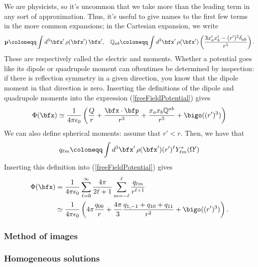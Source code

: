 \documentclass[11pt]{article}
\begin{document}
We are physicists, so it's uncommon that we take more than the leading
term in any sort of approximation. Thus, it's useful to give names to the
first few terms in the more common expansions; in the Cartesian expansion,
we write
\begin{align*}
    & \mathbf{p} \coloneqq \int d^3 \bfx' \, \rho(\bfx') \, \bfx',
    & \mathbb{Q}_{ab} \coloneqq \int d^3 \bfx' \, \rho(\bfx') \left( \frac{3x_a' x_b' - (r')^2 \delta_{ab}}{r^5} \right).
\end{align*}
These are respectively called the electric  and 
moments. Whether a potential goes like its dipole or quadrupole moment can oftentimes
be determined by inspection: if there is reflection symmetry in a given direction,
you know that the dipole moment in that direction is zero.  Inserting the definitions of the dipole and quadrupole moments
into the expression (\ref{freeFieldPotential}) gives
\begin{align*}
    \Phi(\bfx) \simeq \frac{1}{4\pi\epsilon_0} \left( \frac{Q}{r} + \frac{\bfx \cdot \bfp}{r^3} + \frac{x_a x_b \mathbb{Q}^{ab}}{r^5} + \bigo((r')^3) \right)
\end{align*}
We can also define spherical moments: assume that $r' < r$. Then, we have
that
\begin{align*}
    q_{\ell m} \coloneqq \int d^3 \bfx' \, \rho(\bfx') (r')^\ell Y_{\ell m}^*(\Omega')
\end{align*}
Inserting this definition into (\ref{freeFieldPotential}) gives
\begin{align*}
    \Phi(\bfx) & = \frac{1}{4\pi\epsilon_0} \sum_{\ell = 0}^\infty \frac{4\pi}{2\ell + 1} \sum_{m = -\ell}^\ell \frac{q_{\ell m}}{r^{\ell + 1}}\\
    & \simeq \frac{1}{4\pi\epsilon_0} \left( 4\pi \frac{q_{00}}{r} + \frac{4\pi}{3} \frac{q_{1, -1} + q_{10} + q_{11}}{r^2} + \bigo((r')^3) \right).
\end{align*}

\begin{eexample}
\end{eexample}

\subsubsection{Method of images}

\subsubsection{Homogeneous solutions}
\end{document}

